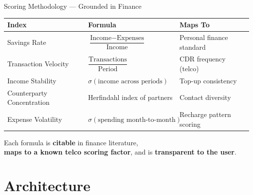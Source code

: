\documentclass[aspectratio=169, 11pt]{beamer}
\begin{document}
\begin{frame}{Scoring Methodology --- Grounded in Finance}
\centering
\small
\begin{tabular}{l l l}
\toprule
\textbf{Index} & \textbf{Formula} & \textbf{Maps To} \\
\midrule
Savings Rate & $\dfrac{\text{Income} - \text{Expenses}}{\text{Income}}$ & Personal finance standard \\[8pt]
Transaction Velocity & $\dfrac{\text{Transactions}}{\text{Period}}$ & CDR frequency (telco) \\[8pt]
Income Stability & $\sigma(\text{income across periods})$ & Top-up consistency \\[8pt]
Counterparty Concentration & Herfindahl index of partners & Contact diversity \\[8pt]
Expense Volatility & $\sigma(\text{spending month-to-month})$ & Recharge pattern scoring \\
\bottomrule
\end{tabular}

\vspace{0.5cm}
Each formula is \textbf{citable} in finance literature,\\\textbf{maps to a known telco scoring factor}, and is \textbf{transparent to the user}.
\end{frame}

\section{Architecture}
\end{document}
